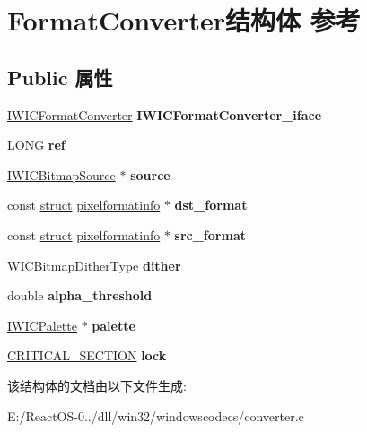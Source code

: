 \hypertarget{struct_format_converter}{}\section{Format\+Converter结构体 参考}
\label{struct_format_converter}
\subsection*{Public 属性}
\begin{DoxyCompactItemize}
\item 
\mbox{\label{struct_format_converter_a5c788a26f82f29edb2d48f601e4a8923}} 
\hyperlink{interface_i_w_i_c_format_converter}{I\+W\+I\+C\+Format\+Converter} {\bfseries I\+W\+I\+C\+Format\+Converter\+\_\+iface}
\item 
\mbox{\label{struct_format_converter_a7c9445df32e1d448bf52ecd62fa5390f}} 
L\+O\+NG {\bfseries ref}
\item 
\mbox{\label{struct_format_converter_a99b777fa81a1b0b4d5b1e373590b1948}} 
\hyperlink{interface_i_w_i_c_bitmap_source}{I\+W\+I\+C\+Bitmap\+Source} $\ast$ {\bfseries source}
\item 
\mbox{\label{struct_format_converter_aa682fc87c2fbdfa9d6be6adcd2003b39}} 
const \hyperlink{interfacestruct}{struct} \hyperlink{structpixelformatinfo}{pixelformatinfo} $\ast$ {\bfseries dst\+\_\+format}
\item 
\mbox{\label{struct_format_converter_a919f2007101da1e964b5d5f6c2cd7741}} 
const \hyperlink{interfacestruct}{struct} \hyperlink{structpixelformatinfo}{pixelformatinfo} $\ast$ {\bfseries src\+\_\+format}
\item 
\mbox{\label{struct_format_converter_acf7b907e994566e1ec46e3c69867092b}} 
W\+I\+C\+Bitmap\+Dither\+Type {\bfseries dither}
\item 
\mbox{\label{struct_format_converter_a2ca79ef4ca576286554445b46411cf33}} 
double {\bfseries alpha\+\_\+threshold}
\item 
\mbox{\label{struct_format_converter_a7c6821ebdae0abae9a1b34a696c7f153}} 
\hyperlink{interface_i_w_i_c_palette}{I\+W\+I\+C\+Palette} $\ast$ {\bfseries palette}
\item 
\mbox{\label{struct_format_converter_afc0051e115fb6b834b106b30d395cef1}} 
\hyperlink{struct___c_r_i_t_i_c_a_l___s_e_c_t_i_o_n}{C\+R\+I\+T\+I\+C\+A\+L\+\_\+\+S\+E\+C\+T\+I\+ON} {\bfseries lock}
\end{DoxyCompactItemize}


该结构体的文档由以下文件生成\+:\begin{DoxyCompactItemize}
\item 
E\+:/\+React\+O\+S-\/0../dll/win32/windowscodecs/converter.\+c\end{DoxyCompactItemize}
